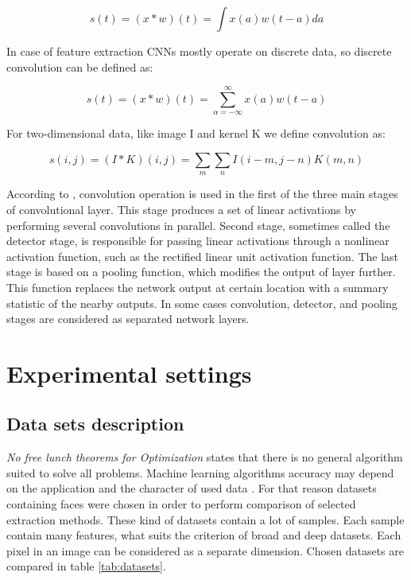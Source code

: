 \documentclass[a4paper, 10 pt, journal]{ieeeconf}
\begin{document}
\begin{equation}
    s(t) = (x*w)(t) = \int x(a)w(t-a)da
\end{equation}

In case of feature extraction CNNs mostly operate on discrete data, so discrete convolution can be defined as:

\begin{equation}
    s(t) = (x*w)(t) = \sum_{\alpha=-\infty}^{\infty} x(a)w(t-a)
\end{equation}

For two-dimensional data, like image I and kernel K we define convolution as:

\begin{equation}
    s(i, j) = (I*K)(i, j) = \sum_m \sum_n I(i-m, j-n)K(m, n)
\end{equation}

According to \cite{Goodfellow-et-al-2016}, convolution operation is used in the first of  the three main stages of convolutional layer. This stage produces a set of linear activations by performing several convolutions in parallel. Second stage, sometimes called the detector stage, is responsible for passing linear activations through a nonlinear activation function, such as the rectified linear unit activation function. The last stage is based on a pooling function, which modifies the output of layer further. This function replaces the network output at certain location with a summary statistic of the nearby outputs. In some cases convolution, detector, and pooling stages are considered as separated network layers.

\section{Experimental settings}

\subsection{Data sets description}

\textsl{No free lunch theorems for Optimization} \cite{no-free-lunch} states that there is no general algorithm suited to solve all problems. Machine learning algorithms accuracy may depend on the application and the character of used data \cite{alppaydin}. For that reason datasets containing faces were chosen in order to perform comparison of selected extraction methods. These kind of datasets contain a lot of samples. Each sample contain many features, what suits the criterion of broad and deep datasets. Each pixel in an image can be considered as a separate dimension. Chosen datasets are compared in table \ref{tab:datasets}.
\end{document}
